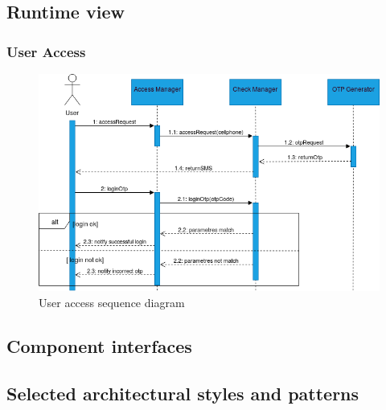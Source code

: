 \newpage

\subsection{Runtime view}
\subsubsection{User Access}
	\begin{figure}[H]
	
		\includegraphics[width=\textwidth]{Images/RunTimeViewUserAccess.png}		
		\caption{\label{fig:UserAccess}User access sequence diagram}
	\end{figure}
\subsection{Component interfaces}

\subsection{Selected architectural styles and patterns}